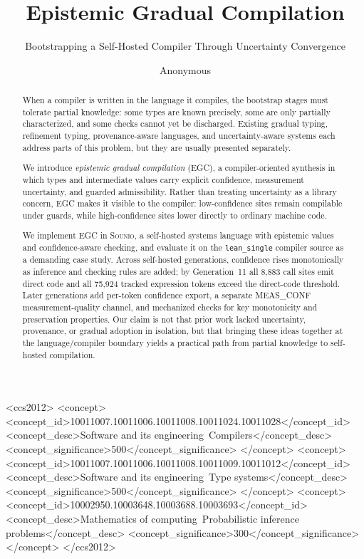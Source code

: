 \documentclass[acmsmall,screen,review,anonymous]{acmart}
\newcommand{\sounio}{\textsc{Sounio}\xspace}
\newcommand{\lean}{\texttt{lean\_single}\xspace}
\begin{document}
\title{Epistemic Gradual Compilation}
\subtitle{Bootstrapping a Self-Hosted Compiler Through Uncertainty Convergence}

\author{Anonymous}

\begin{abstract}
When a compiler is written in the language it compiles, the bootstrap stages
must tolerate partial knowledge: some types are known precisely, some are only
partially characterized, and some checks cannot yet be discharged.
Existing gradual typing, refinement typing, provenance-aware languages, and
uncertainty-aware systems each address parts of this problem, but they are
usually presented separately.

We introduce \emph{epistemic gradual compilation} (EGC), a compiler-oriented
synthesis in which types and intermediate values carry explicit confidence,
measurement uncertainty, and guarded admissibility.
Rather than treating uncertainty as a library concern, EGC makes it visible
to the compiler: low-confidence sites remain compilable under guards, while
high-confidence sites lower directly to ordinary machine code.

We implement EGC in \sounio, a self-hosted systems language with epistemic
values and confidence-aware checking, and evaluate it on the \lean compiler
source as a demanding case study.
Across self-hosted generations, confidence rises monotonically as inference
and checking rules are added; by Generation~11 all 8,883 call sites emit
direct code and all 75,924 tracked expression tokens exceed the direct-code
threshold.
Later generations add per-token confidence export, a separate
\textsc{MEAS\_CONF} measurement-quality channel, and mechanized checks for key
monotonicity and preservation properties.
Our claim is not that prior work lacked uncertainty, provenance, or gradual
adoption in isolation, but that bringing these ideas together at the
language/compiler boundary yields a practical path from partial knowledge to
self-hosted compilation.
\end{abstract}

\begin{CCSXML}
<ccs2012>
<concept>
<concept_id>10011007.10011006.10011008.10011024.10011028</concept_id>
<concept_desc>Software and its engineering~Compilers</concept_desc>
<concept_significance>500</concept_significance>
</concept>
<concept>
<concept_id>10011007.10011006.10011008.10011009.10011012</concept_id>
<concept_desc>Software and its engineering~Type systems</concept_desc>
<concept_significance>500</concept_significance>
</concept>
<concept>
<concept_id>10002950.10003648.10003688.10003693</concept_id>
<concept_desc>Mathematics of computing~Probabilistic inference problems</concept_desc>
<concept_significance>300</concept_significance>
</concept>
</ccs2012>
\end{CCSXML}
\end{document}
